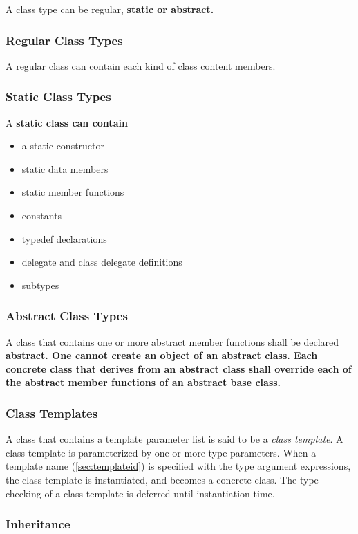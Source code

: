 \documentclass[a4paper,oneside,11pt]{article}
\begin{document}
A class type can be regular, \bf{static} or \bf{abstract}.

\subsubsection{Regular Class Types}

A regular class can contain each kind of class content members.

\subsubsection{Static Class Types}

A \bf{static} class can contain
\begin{itemize}
\item a static constructor
\item static data members
\item static member functions
\item constants
\item typedef declarations
\item delegate and class delegate definitions
\item subtypes
\end{itemize}

\subsubsection{Abstract Class Types}

A class that contains one or more abstract member functions shall be declared \bf{abstract}.
One cannot create an object of an abstract class.
Each concrete class that derives from an abstract class shall override each of the
abstract member functions of an abstract base class.

\subsubsection{Class Templates}

A class that contains a template parameter list is said to be a \emph{class template}.
A class template is parameterized by one or more type parameters.
When a template name (\ref{sec:templateid}) is specified with the type argument expressions,
the class template is instantiated, and becomes a concrete class.
The type-checking of a class template is deferred until instantiation time.

\subsubsection{Inheritance}
\end{document}
